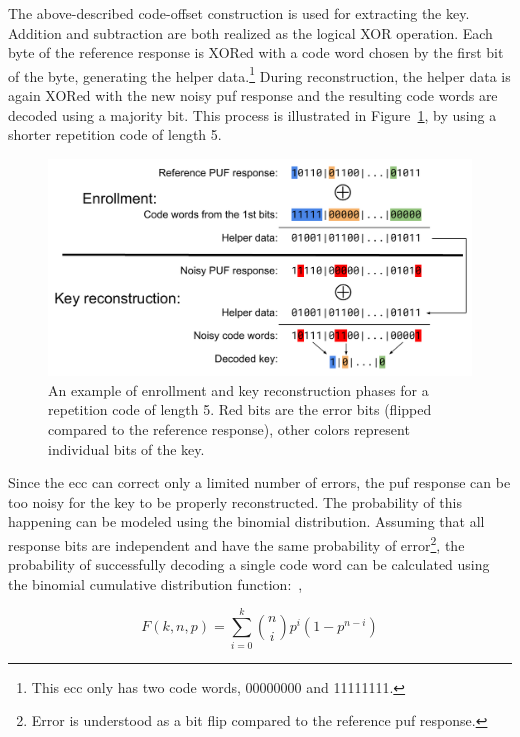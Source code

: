 The above-described code-offset construction is used for extracting the key. Addition and subtraction are both realized as the logical XOR operation. Each byte of the reference response is XORed with a code word chosen by the first bit of the byte, generating the helper data.\footnote{This \gls{ecc} only has two code words, 00000000 and 11111111.} During reconstruction, the helper data is again XORed with the new noisy \gls{puf} response and the resulting code words are decoded using a majority bit. This process is illustrated in Figure~\ref{fig:ecc_diagram}, by using a shorter repetition code of length 5.

\begin{figure}[ht!]
    \centering
    \captionsetup{margin=0.5cm}
    \includegraphics[width=\textwidth]{images/ecc_diagram.pdf}
    \caption[An example of enrollment and key reconstruction phases for a repetition code of length 5.]{An example of enrollment and key reconstruction phases for a repetition code of length 5. Red bits are the error bits (flipped compared to the reference response), other colors represent individual bits of the key.~\cite{Kodytek2017}}
    \label{fig:ecc_diagram}
\end{figure}

Since the \gls{ecc} can correct only a limited number of errors, the \gls{puf} response can be too noisy for the key to be properly reconstructed. The probability of this happening can be modeled using the binomial distribution. Assuming that all response bits are independent and have the same probability of error\footnote{Error is understood as a bit flip compared to the reference \gls{puf} response.}, the probability of successfully decoding a single code word can be calculated using the binomial cumulative distribution function:~\cite{Iluminada2015},~\cite{Bosch2008}

\begin{equation}\label{eq:binomial_cdf}
    F(k, n, p) = \sum_{i=0}^{k}\binom{n}{i}p^{i}(1-p^{n-i})
\end{equation}

